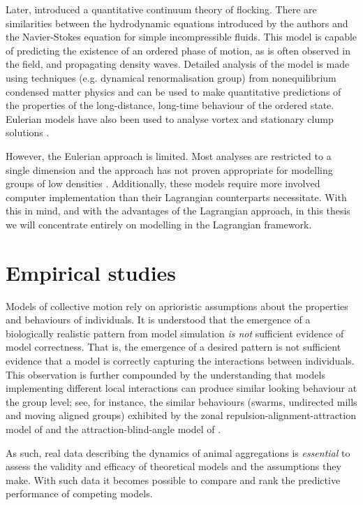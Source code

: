 Later, \textcite{toner98} introduced a quantitative continuum theory of
flocking. There are similarities between the hydrodynamic equations introduced
by the authors and the Navier-Stokes equation for simple incompressible fluids.
This model is capable of predicting the existence of an ordered phase of
motion, as is often observed in the field, and propagating density waves.
Detailed analysis of the model is made using techniques (e.g. dynamical
renormalisation group) from nonequilibrium condensed matter physics and can be
used to make quantitative predictions of the properties of the long-distance,
long-time behaviour of the ordered state. Eulerian models have also been used
to analyse vortex and stationary clump solutions \parencite{topaz04,topaz06}.

However, the Eulerian approach is limited. Most analyses are restricted to a
single dimension and the approach has not proven appropriate for modelling
groups of low densities \parencite{giardina08}. Additionally, these models
require more involved computer implementation than their Lagrangian
counterparts necessitate. With this in mind, and with the advantages of the
Lagrangian approach, in this thesis we will concentrate entirely on modelling
in the Lagrangian framework.

\section{Empirical studies}
\label{sec:empirical_studies}

Models of collective motion rely on aprioristic assumptions about the
properties and behaviours of individuals. It is understood that the emergence
of a biologically realistic pattern from model simulation \emph{is not}
sufficient evidence of model correctness. That is, the emergence of a desired
pattern is not sufficient evidence that a model is correctly capturing the
interactions between individuals. This observation is further compounded by the
understanding that models implementing different local interactions can produce
similar looking behaviour at the group level; see, for instance, the similar
behaviours (swarms, undirected mills and moving aligned groups) exhibited by
the zonal repulsion-alignment-attraction model of \textcite{couzin02} and the
attraction-blind-angle model of \textcite{strombom11}.

As such, real data describing the dynamics of animal aggregations is
\emph{essential} to assess the validity and efficacy of theoretical models and
the assumptions they make. With such data it becomes possible to compare and
rank the predictive performance of competing models.

